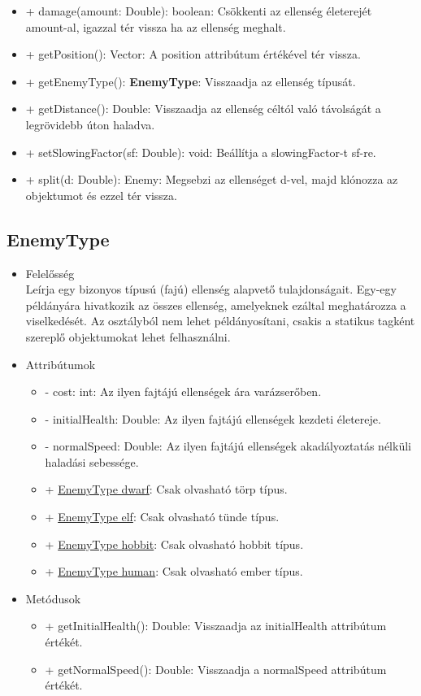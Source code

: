 \begin{itemize}
\begin{itemize}
		\item + damage(amount: Double): boolean: Csökkenti az ellenség életerejét amount-al, igazzal tér vissza ha az ellenség meghalt.
		\item + getPosition(): Vector: A position attribútum értékével tér vissza.
		\item + getEnemyType(): \textbf{EnemyType}: Visszaadja az ellenség típusát.
		\item + getDistance(): Double: Visszaadja az ellenség céltól való távolságát a legrövidebb úton haladva.
		\item + setSlowingFactor(sf: Double): void: Beállítja a slowingFactor-t sf-re.
		\item + split(d: Double): Enemy: Megsebzi az ellenséget d-vel, majd klónozza az objektumot és ezzel tér vissza.
	\end{itemize}
\end{itemize}


\subsection{EnemyType}
\begin{itemize}
\item Felelősség\\
Leírja egy bizonyos típusú (fajú) ellenség alapvető tulajdonságait. Egy-egy példányára hivatkozik az összes ellenség, amelyeknek ezáltal meghatározza a viselkedését. Az osztályból nem lehet példányosítani, csakis a statikus tagként szereplő objektumokat lehet felhasználni.
\item Attribútumok
	\begin{itemize}
		\item - cost: int: Az ilyen fajtájú ellenségek ára varázserőben.
		\item - initialHealth: Double: Az ilyen fajtájú ellenségek kezdeti életereje.
		\item - normalSpeed: Double: Az ilyen fajtájú ellenségek akadályoztatás nélküli haladási sebessége.
		\item + \underline{EnemyType dwarf}: Csak olvasható törp típus.
		\item + \underline{EnemyType elf}: Csak olvasható tünde típus.
		\item + \underline{EnemyType hobbit}: Csak olvasható hobbit típus.
		\item + \underline{EnemyType human}: Csak olvasható ember típus.
	\end{itemize}
\item Metódusok
	\begin{itemize}
		\item + getInitialHealth(): Double: Visszaadja az initialHealth attribútum értékét.
		\item + getNormalSpeed(): Double: Visszaadja a normalSpeed attribútum értékét.
	\end{itemize}
\end{itemize}

